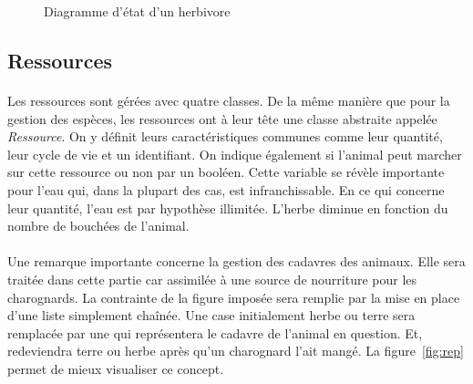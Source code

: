 \documentclass[a4paper,11pt,final,oneside]{article}
\begin{document}
\begin{figure}[h!]
{
\caption{Diagramme d'état d'un herbivore}
\label{fig:her}}
\end{figure}

		\subsection{Ressources}
		
\paragraph{} Les ressources sont gérées avec quatre classes. De la même manière que pour la gestion des espèces, les ressources ont à leur tête une classe abstraite appelée \textit{Ressource}. On y définit leurs caractéristiques communes comme leur quantité, leur cycle de vie et un identifiant. On indique également si l'animal peut marcher sur cette ressource ou non par un booléen. Cette variable se révèle importante pour l'eau qui, dans la plupart des cas, est infranchissable. En ce qui concerne leur quantité, l'eau est par hypothèse illimitée. L'herbe diminue en fonction du nombre de bouchées de l'animal.

\paragraph{} Une remarque importante concerne la gestion des cadavres des animaux. Elle sera traitée dans cette partie car assimilée à une source de nourriture pour les charognards. La contrainte de la figure imposée sera remplie par la mise en place d'une liste simplement chaînée. Une case initialement herbe ou terre sera remplacée par une qui représentera le cadavre de l'animal en question. Et, redeviendra terre ou herbe après qu'un charognard l'ait mangé. La figure~\ref{fig:rep} permet de mieux visualiser ce concept. \\
\end{document}
